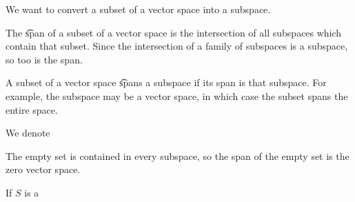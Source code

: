 
\sbasic






























\sstart
{}


We want to convert a subset of a vector space into a subspace.


The \t{span} of a subset of a vector space is the intersection of all subspaces which contain that subset.
Since the intersection of a family of subspaces is a subspace, so too is the span.

A subset of a vector space \t{spans} a subspace if its span is that subspace.
For example, the subspace may be a vector space, in which case the subset spans the entire space.


We denote


\begin{prop}
  The empty set is contained in every subspace, so the span of the empty set is the zero vector space.
\end{prop}

If $S$ is a
\strats
